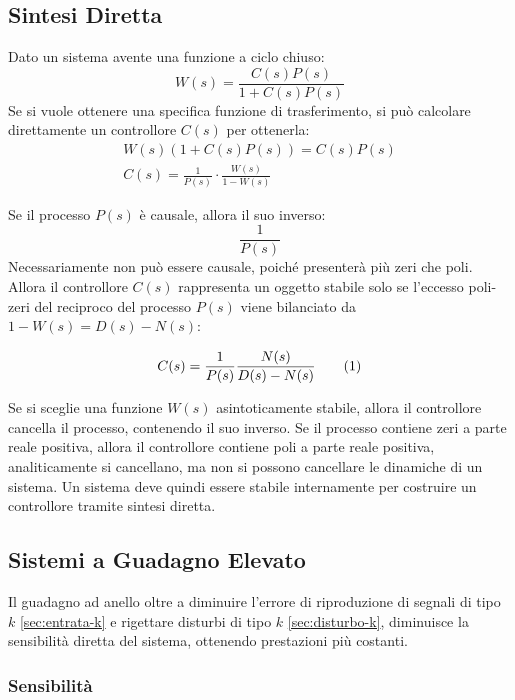 \documentclass{article}
\numberwithin{equation}{subsection}
\newcommand{\tageq}{\tag{\stepcounter{equation}\theequation}}
\begin{document}
\subsection{Sintesi Diretta}

Dato un sistema avente una funzione a ciclo chiuso:
\begin{equation*}
    W(s)=\displaystyle\frac{C(s)P(s)}{1+C(s)P(s)}
\end{equation*}
Se si vuole ottenere una specifica funzione di trasferimento, si può 
calcolare direttamente un controllore $C(s)$ per ottenerla: 
\begin{gather*}
    W(s)(1+C(s)P(s))=C(s)P(s)\\
    C(s)=\displaystyle\frac{1}{P(s)}\cdot\frac{W(s)}{1-W(s)}
\end{gather*}

Se il processo $P(s)$ è causale, allora il suo inverso:
\begin{equation*}
    \displaystyle\frac{1}{P(s)}
\end{equation*}
Necessariamente non può essere causale, poiché presenterà più zeri che poli. Allora il controllore $C(s)$ 
rappresenta un oggetto stabile solo se l'eccesso poli-zeri del reciproco del processo $P(s)$ viene bilanciato da $1-W(s)=D(s)-N(s)$: 

\begin{equation*}
    C(s)=\displaystyle\frac{1}{P(s)}\frac{N(s)}{D(s)-N(s)}\tageq
\end{equation*}

Se si sceglie una funzione $W(s)$ asintoticamente stabile, allora il controllore cancella il processo, contenendo il suo inverso. Se il processo contiene zeri 
a parte reale positiva, allora il controllore contiene poli a parte reale positiva, analiticamente si cancellano, ma non si possono cancellare le dinamiche di un sistema. Un 
sistema deve quindi essere stabile internamente per costruire un controllore tramite sintesi diretta. 

\subsection{Sistemi a Guadagno Elevato}

Il guadagno ad anello oltre a diminuire l'errore di riproduzione di segnali di tipo $k$ \ref{sec:entrata-k} e rigettare disturbi di tipo $k$ \ref{sec:disturbo-k}, diminuisce la sensibilità diretta del 
sistema, ottenendo prestazioni più costanti. 

\subsubsection{Sensibilità}
\end{document}
